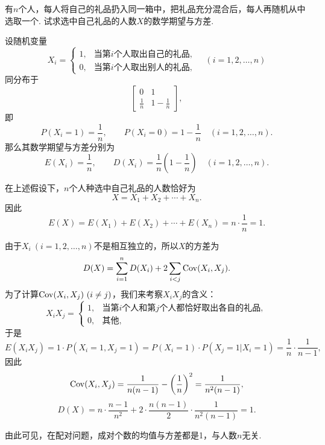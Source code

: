 \begin{example}[配对问题]
有\(n\)个人，每人将自己的礼品扔入同一箱中，把礼品充分混合后，每人再随机从中选取一个.
试求选中自己礼品的人数\(X\)的数学期望与方差.
\begin{solution}
设随机变量\[
X_i = \left\{ \begin{array}{ll}
1, & \text{当第\(i\)个人取出自己的礼品}, \\
0, & \text{当第\(i\)个人取出别人的礼品},
\end{array} \right.
\quad(i=1,2,\dotsc,n)
\]同分布于\[
\begin{bmatrix}
0 & 1 \\
\frac{1}{n} & 1-\frac{1}{n}
\end{bmatrix},
\]
即\[
P(X_i=1) = \frac{1}{n}, \qquad
P(X_i=0) = 1-\frac{1}{n}
\quad(i=1,2,\dotsc,n).
\]
那么其数学期望与方差分别为\[
E(X_i) = \frac{1}{n},
\qquad
D(X_i) = \frac{1}{n}\left(1-\frac{1}{n}\right)
\quad(i=1,2,\dotsc,n).
\]

在上述假设下，\(n\)个人种选中自己礼品的人数恰好为\[
X = X_1+X_2+\dotsb+X_n.
\]因此\[
E(X) = E(X_1)+E(X_2)+\dotsb+E(X_n)
= n \cdot \frac{1}{n}
= 1.
\]

由于\(X_i\ (i=1,2,\dotsc,n)\)不是相互独立的，所以\(X\)的方差为\[
D(X) = \sum\limits_{i=1}^n D(X_i) + 2 \sum\limits_{i<j} \operatorname{Cov}(X_i,X_j).
\]为了计算\(\operatorname{Cov}(X_i,X_j)\ (i \neq j)\)，我们来考察\(X_i X_j\)的含义：\[
X_i X_j = \left\{ \begin{array}{ll}
1, & \text{当第\(i\)个人和第\(j\)个人都恰好取出各自的礼品}, \\
0, & \text{其他},
\end{array} \right.
\]于是\[
E(X_i X_j) = 1 \cdot P(X_i=1,X_j=1)
= P(X_i=1) \cdot P(X_j=1 \vert X_i=1)
= \frac{1}{n} \cdot \frac{1}{n-1},
\]因此\[
\operatorname{Cov}(X_i,X_j) = \frac{1}{n(n-1)} - \left(\frac{1}{n}\right)^2
= \frac{1}{n^2(n-1)},
\]\[
D(X) = n \cdot \frac{n-1}{n^2} + 2 \cdot \frac{n(n-1)}{2} \cdot \frac{1}{n^2(n-1)}
= 1.
\]
\end{solution}
由此可见，在配对问题，成对个数的均值与方差都是1，与人数\(n\)无关.
\end{example}


